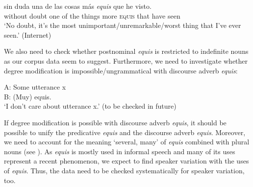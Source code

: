 \documentclass[output=paper
,modfonts
,nonflat]{langsci/langscibook}
\begin{document}
\ea
\gll sin duda una de las cosas más \textit{equis} que he visto.\\
without doubt one of the things more \textsc{equis} that have seen\\
\glt ‘No doubt, it’s the most unimportant/unremarkable/worst thing that I’ve ever seen.’ (Internet)
\z

We also need to check whether postnominal \textit{equis} is restricted to indefinite nouns as our corpus data seem to suggest. Furthermore, we need to investigate whether degree modification is impossible/ungrammatical with discourse adverb \textit{equis}:

\ea
\gll A: Some utterance x \\
B: (Muy) equis.\\
\glt ‘I don’t care about utterance x.’ (to be checked in future)
\z

If degree modification is possible with discourse adverb \textit{equis}, it should be possible to unify the predicative \textit{equis} and the discourse adverb \textit{equis}. Moreover, we need to account for the meaning ‘several, many’ of \textit{equis} combined with plural nouns (see ).
As \textit{equis} is mostly used in informal speech and many of its uses represent a recent phenomenon, we expect to find speaker variation with the uses of \textit{equis}. Thus, the data need to be checked systematically for speaker variation, too.


{\sloppy\printbibliography[heading=subbibliography,notkeyword=this]}
\end{document}
